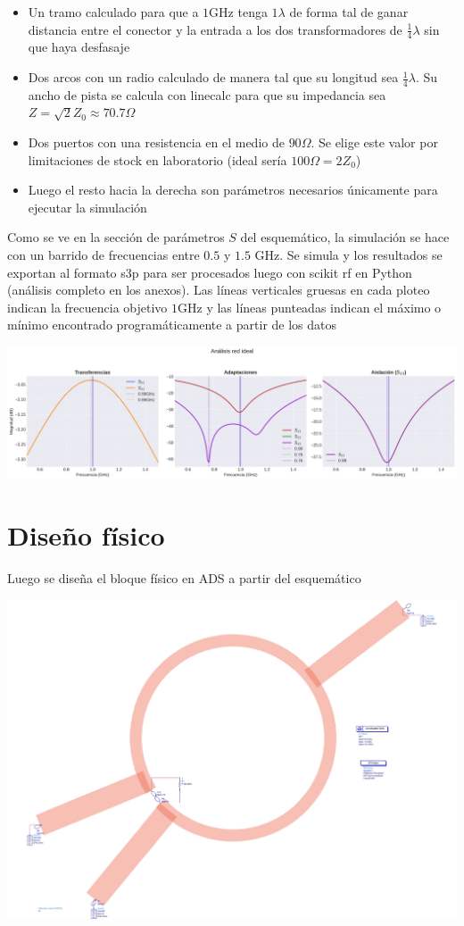 \documentclass[a4paper, 12pt]{article}
\begin{document}
\begin{itemize}
    \item Un tramo calculado para que a $1\text{GHz}$ tenga $1\lambda$ de forma tal de ganar distancia entre el conector y la entrada a los dos transformadores de $\frac{1}{4}\lambda$ sin que haya desfasaje
    \item Dos arcos con un radio calculado de manera tal que su longitud sea $\frac{1}{4}\lambda$. Su ancho de pista se calcula con linecalc para que su impedancia sea $Z = \sqrt{2}Z_0 \approx 70.7\Omega$
    \item Dos puertos con una resistencia en el medio de $90\Omega$. Se elige este valor por limitaciones de stock en laboratorio (ideal sería $100\Omega = 2Z_0$)
    \item Luego el resto hacia la derecha son parámetros necesarios únicamente para ejecutar la simulación
\end{itemize}
Como se ve en la sección de parámetros $S$ del esquemático, la simulación se hace con un barrido de frecuencias entre $0.5$ y $1.5 \text{ GHz}$. Se simula y los resultados se exportan al formato s3p para ser procesados luego con scikit rf en Python (análisis completo en los anexos).
Las líneas verticales gruesas en cada ploteo indican la frecuencia objetivo $1\text{GHz}$ y las líneas punteadas indican el máximo o mínimo encontrado programáticamente a partir de los datos

\includegraphics[width=0.9\linewidth]{./img/plot-ideal.png}

\section*{Diseño físico}
Luego se diseña el bloque físico en ADS a partir del esquemático

\includegraphics[width=0.6\linewidth]{./img/simulado.jpg}
\end{document}
